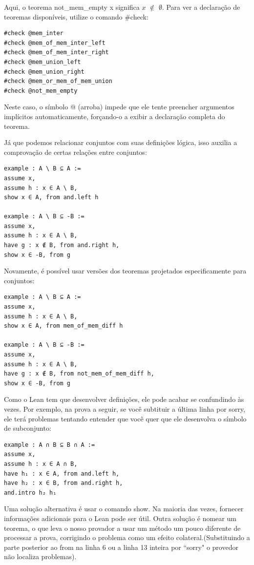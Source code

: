 Aqui, o teorema {
\selectfont not\_mem\_empty x} significa $x$ $\notin$ $\emptyset$. Para ver a declaração de teoremas disponíveis, utilize o comando{
\selectfont \#check}:
\begin{lstlisting}
#check @mem_inter
#check @mem_of_mem_inter_left
#check @mem_of_mem_inter_right
#check @mem_union_left
#check @mem_union_right
#check @mem_or_mem_of_mem_union
#check @not_mem_empty \end{lstlisting}

Neste caso, o símbolo{
\selectfont @} (arroba) impede que ele tente preencher argumentos implícitos automaticamente, forçando-o a exibir a declaração completa do teorema.

Já que podemos relacionar conjuntos com suas definições lógica, isso auxilia a comprovação de certas relações entre conjuntos:

\begin{lstlisting}
example : A \ B ⊆ A :=
assume x,
assume h : x ∈ A \ B,
show x ∈ A, from and.left h

example : A \ B ⊆ -B :=
assume x,
assume h : x ∈ A \ B,
have g : x ∉ B, from and.right h,
show x ∈ -B, from g \end{lstlisting}

Novamente, é possível usar versões dos teoremas projetados especificamente para conjuntos:

\begin{lstlisting}
example : A \ B ⊆ A :=
assume x,
assume h : x ∈ A \ B,
show x ∈ A, from mem_of_mem_diff h

example : A \ B ⊆ -B :=
assume x,
assume h : x ∈ A \ B,
have g : x ∉ B, from not_mem_of_mem_diff h,
show x ∈ -B, from g \end{lstlisting}

Como o Lean tem que desenvolver definições, ele pode acabar se confundindo às vezes. Por exemplo, na prova a seguir, se você subtituir a última linha por {\selectfont sorry}, ele terá problemas tentando entender que você quer que ele desenvolva o símbolo de subconjunto:

\begin{lstlisting}
example : A ∩ B ⊆ B ∩ A :=
assume x,
assume h : x ∈ A ∩ B,
have h₁ : x ∈ A, from and.left h,
have h₂ : x ∈ B, from and.right h,
and.intro h₂ h₁ \end{lstlisting}

Uma solução alternativa é usar o comando {\selectfont show}. Na maioria das vezes, fornecer informações adicionais para o Lean pode ser útil. Outra solução é nomear um teorema, o que leva o nosso provador a usar um método um pouco diferente de processar a prova, corrigindo o problema como um efeito colateral.(Substituindo a parte posterior ao {\selectfont from} na linha 6 ou a linha 13 inteira por ``{\selectfont sorry}" o provedor não localiza problemas).

